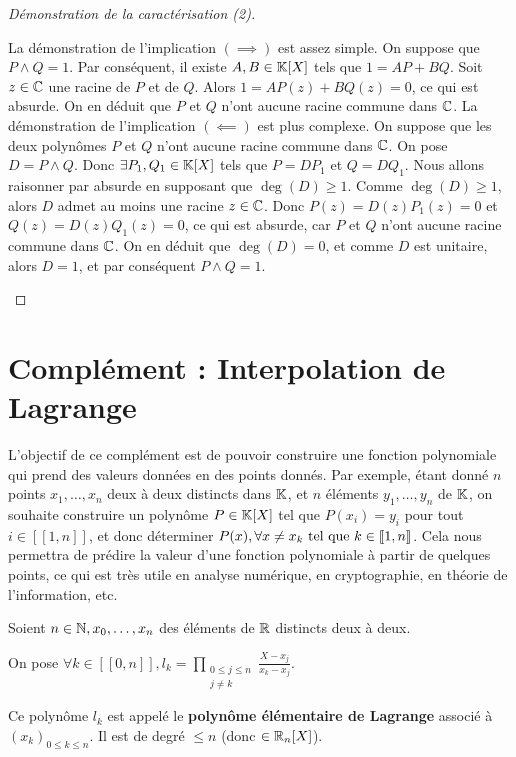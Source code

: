 \documentclass[12pt, a4paper]{report}
\begin{document}
\begin{proof}[Démonstration de la caractérisation (2)]
    \begin{outline}
        \1 La démonstration de l'implication $(\implies)$ est assez simple.
        \2 On suppose que $P \wedge Q = 1$. 
        \2 Par conséquent, il existe $A,B \in \mathbb{K}[X]$ tels que $1 = AP + BQ$.
        \2 Soit $z \in \mathbb{C}$ une racine de $P$ et de $Q$. Alors $1 = AP(z) + BQ(z) = 0$, ce qui est absurde.
        \2 On en déduit que $P$ et $Q$ n'ont aucune racine commune dans $\mathbb{C}$.
        \1 La démonstration de l'implication $(\impliedby)$ est plus complexe. %
        \2 On suppose que les deux polynômes $P$ et $Q$ n'ont aucune racine commune dans $\mathbb{C}$.
        \2 On pose $D = P \wedge Q$.
        \2 Donc $\exists P_1, Q_1 \in \mathbb{K}[X]$ tels que $P = D P_1$ et $Q = D Q_1$.
        \2 Nous allons raisonner par absurde en supposant que $\deg(D) \ge 1$.
        \2 Comme $\deg(D) \ge 1$, alors $D$ admet au moins une racine $z \in \mathbb{C}$.
        \2 Donc $P(z) = D(z) P_1(z) = 0$ et $Q(z) = D(z) Q_1(z) = 0$, ce qui est absurde, car $P$ et $Q$ n'ont aucune racine commune dans $\mathbb{C}$.
        \2 On en déduit que $\deg(D) = 0$, et comme $D$ est unitaire, alors $D = 1$, et par conséquent $P \wedge Q = 1$.
    \end{outline}
\end{proof}

\chapter{Complément : Interpolation de Lagrange}

L'objectif de ce complément est de pouvoir construire une fonction polynomiale qui prend des valeurs données en des points donnés. Par exemple, étant donné $n$ points $x_1,\dots,x_n$ deux à deux distincts dans $\mathbb{K}$, et $n$ éléments $y_1,\dots,y_n$ de $\mathbb{K}$, on souhaite construire un polynôme $P \in \mathbb{K}[X]$ tel que $P(x_i) = y_i$ pour tout $i \in [\![1,n]\!]$, et donc déterminer $P(x), \forall x \ne x_k \text{ tel que } k \in [\![1,n]\!]$. Cela nous permettra de prédire la valeur d'une fonction polynomiale à partir de quelques points, ce qui est très utile en analyse numérique, en cryptographie, en théorie de l'information, etc.

\begin{definition}
    Soient $n \in \mathbb{N}, x_0,\dots,x_n$ des éléments de $\mathbb{R}$ distincts deux à deux.

    On pose $\forall k \in [\![0,n]\!], l_k = \prod_{\substack{0 \le j \le n \\ j \ne k}} \frac{X-x_j}{x_k - x_j}$.

    Ce polynôme $l_k$ est appelé le \textbf{polynôme élémentaire de Lagrange} associé à $(x_k)_{0 \le k \le n}$. Il est de degré $\le n$ (donc $\in \mathbb{R}_n[X]$).
\end{definition}
\end{document}
